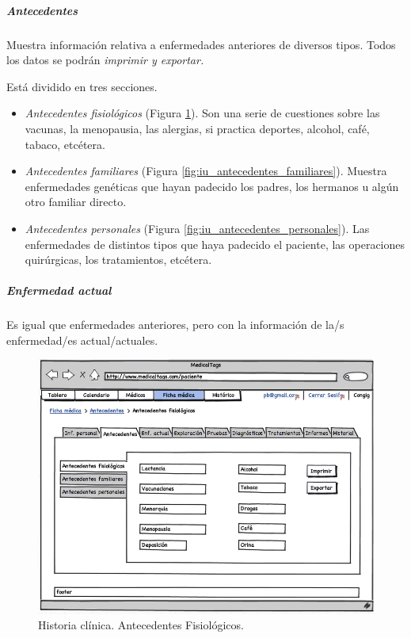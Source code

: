 		\subparagraph{Antecedentes} %
		\label{par:inter_antecedentes}
		
			Muestra información relativa a enfermedades anteriores de diversos tipos. Todos los datos se podrán \textit{imprimir y exportar.}
			
			Está dividido en tres secciones.
			
			\begin{itemize}
				\item \textit{Antecedentes fisiológicos} (Figura \ref{fig:iu_antecedentes_fisiologicos}). Son una serie de cuestiones sobre las vacunas, la menopausia, las alergias, si practica deportes, alcohol, café, tabaco, etcétera.
				\item \textit{Antecedentes familiares} (Figura \ref{fig:iu_antecedentes_familiares}). Muestra enfermedades genéticas que hayan padecido los padres, los hermanos u algún otro familiar directo. 
				
				\item \textit{Antecedentes personales} (Figura \ref{fig:iu_antecedentes_personales}). Las enfermedades de distintos tipos que haya padecido el paciente, las operaciones quirúrgicas, los tratamientos, etcétera. 
			\end{itemize}
			
			
			\subparagraph{Enfermedad actual} %
			\label{par:enfermedad_actual}
				Es igual que enfermedades anteriores, pero con la información de la/s enfermedad/es actual/actuales.
			
			\begin{figure}[H]
			  \centering
			    \includegraphics[width=12cm]{img/png/interfaz/30_Antecedentes_pacientes.png}
			  \caption{Historia clínica. Antecedentes Fisiológicos.}
			  \label{fig:iu_antecedentes_fisiologicos}
			\end{figure}
			
